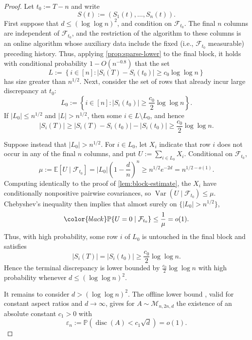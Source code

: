 \documentclass[reqno,english]{amsart}
\newcommand*{\PP}{\mathbb P}
\newcommand*{\EE}{\mathbb E}
\newcommand*{\calF}{\mathcal F}
\newcommand*{\Var}{\operatorname{Var}}
\newcommand*{\disc}{\operatorname{disc}}
\theoremstyle{definition}
\begin{document}
\begin{proof}
Let $t_0:=T-n$ and write
\[
    S(t):=(S_1(t),\ldots,S_n(t)).
\]
First suppose that $d\le(\log\log n)^2$, and condition on $\calF_{t_0}$.  The final
$n$ columns are independent of $\calF_{t_0}$, and the restriction of the
algorithm to these columns is an online algorithm whose auxiliary data
include the fixed (i.e., $\mathcal{F}_{t_0}$ measurable) preceding history.  Thus, applying
\cref{prop:sparse-lower} to the final block, it holds with conditional probability
$1-O(n^{-0.8})$ that the set
\[
    L:=\left\{i\in[n]:
       |S_i(T)-S_i(t_0)|\ge c_0\log\log n\right\}
\]
has size greater than $n^{1/2}$. Next, consider the set of rows that already incur large discrepancy at $t_0$:
\[
    L_0:=\left\{i\in[n]:
       |S_i(t_0)|\ge\frac{c_0}{2}\log\log n\right\}.
\]
If $|L_0|\le n^{1/2}$ and $|L|>n^{1/2}$, then some $i\in L\setminus L_0$,
and hence
\[
    |S_i(T)|
    \ge |S_i(T)-S_i(t_0)|-|S_i(t_0)|
    \ge\frac{c_0}{2}\log\log n.
\]

Suppose instead that $|L_0|>n^{1/2}$.  For $i\in L_0$, let $X_i$ indicate
that row $i$ does not occur in any of the final $n$ columns, and put
$U:=\sum_{i\in L_0}X_i$.  Conditional on $\calF_{t_0}$,
\[
    \mu:=\EE[U\mid\calF_{t_0}]
    =|L_0|\left(1-\frac dn\right)^n
    \ge n^{1/2}e^{-2d}
    =n^{1/2-o(1)}.
\]
Computing identically to the proof of \cref{lem:block-estimate}, the $X_i$ have conditionally
nonpositive pairwise covariances, so $\Var(U\mid\calF_{t_0})\le\mu$. Chebyshev's inequality then implies that almost surely on $\{|L_0|>n^{1/2}\}$,
\[
{\color{black}\PP\{U=0\mid\calF_{t_0}\}\le\frac1\mu=o(1).}
\]
Thus, with high probability,
some row $i$ of $L_0$ is untouched in the final block and satisfies
\[
    |S_i(T)|=|S_i(t_0)|
    \ge\frac{c_0}{2}\log\log n.
\]
Hence the terminal discrepancy is lower bounded by $\frac{c_0}{2}\log\log n$ with high probability whenever $d\le(\log\log n)^2$.

It remains to consider
$d>(\log\log n)^2$. The offline lower bound \cite{random-hypergraph-discrepancy}, valid for constant aspect ratios and $d \to \infty$,
gives for $A \sim \mathcal{M}_{n,2n,d}$ the existence of an absolute constant $c_1>0$ with
\[
    \varepsilon_n:=
    \PP\left(\disc(A)<c_1\sqrt d\right)=o(1).
\]


\end{proof}
\end{document}
